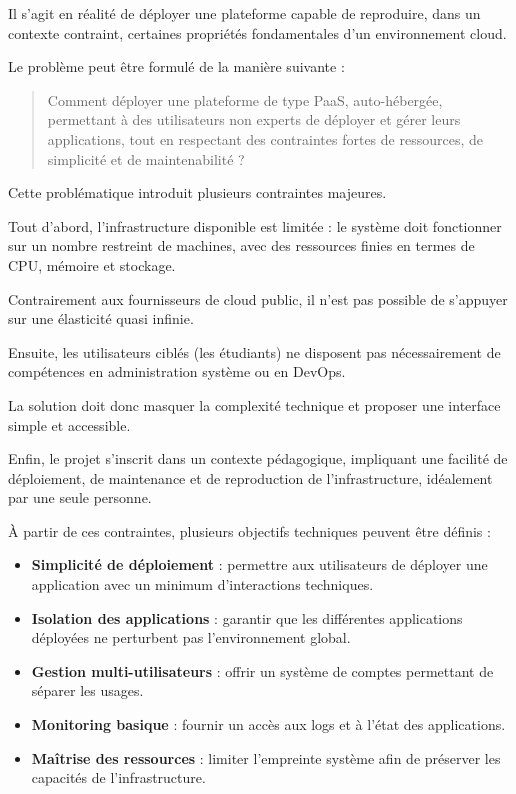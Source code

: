 \documentclass{rapportClass} %
\begin{document}
\smallskip
Il s'agit en réalité de déployer une plateforme capable de reproduire, dans un contexte
contraint, certaines propriétés fondamentales d'un environnement cloud.

\smallskip
Le problème peut être formulé de la manière suivante :

\begin{quote}
Comment déployer une plateforme de type PaaS,
auto-hébergée, permettant à des utilisateurs non experts de déployer
et gérer leurs applications, tout en respectant des contraintes fortes
de ressources, de simplicité et de maintenabilité ?
\end{quote}

Cette problématique introduit plusieurs contraintes majeures.

\smallskip
Tout d'abord, l'infrastructure disponible est limitée : le système doit
fonctionner sur un nombre restreint de machines, avec des ressources
finies en termes de CPU, mémoire et stockage. 

\smallskip
Contrairement aux fournisseurs de cloud public, il n'est pas possible de s'appuyer sur
une élasticité quasi infinie.

\smallskip
Ensuite, les utilisateurs ciblés (les étudiants) ne disposent pas
nécessairement de compétences en administration système ou en DevOps.

\smallskip
La solution doit donc masquer la complexité technique et proposer une
interface simple et accessible.

\smallskip
Enfin, le projet s'inscrit dans un contexte pédagogique, impliquant une
facilité de déploiement, de maintenance et de reproduction de
l'infrastructure, idéalement par une seule personne.

\smallskip
À partir de ces contraintes, plusieurs objectifs techniques peuvent
être définis :

\begin{itemize}
\item \textbf{Simplicité de déploiement} : permettre aux utilisateurs de
déployer une application avec un minimum d'interactions techniques.
\item \textbf{Isolation des applications} : garantir que les différentes
applications déployées ne perturbent pas l'environnement global.
\item \textbf{Gestion multi-utilisateurs} : offrir un système de comptes
permettant de séparer les usages.
\item \textbf{Monitoring basique} : fournir un accès aux logs et à
l'état des applications.
\item \textbf{Maîtrise des ressources} : limiter l'empreinte système
afin de préserver les capacités de l'infrastructure.
\end{itemize}
\end{document}

